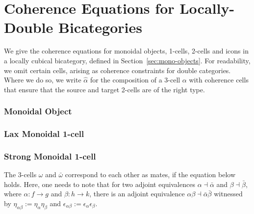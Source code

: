 \section{Coherence Equations for Locally-Double Bicategories}
\label{ap:coherence}

We give the coherence equations for  monoidal objects, 1-cells, 2-cells and icons in a locally cubical bicategory, defined in Section~\ref{sec:mono-objects}. For readability, we omit certain cells, arising as coherence constraints for double categories. Where we do so, we write $\hat{\alpha}$ for the composition of a 3-cell ${\alpha}$ with coherence cells that ensure that the source and target 2-cells are of the right type.

\subsubsection*{Monoidal Object}

 \newpage
 \newpage
 \newpage


\subsubsection*{Lax Monoidal 1-cell}

 \newpage
 \newpage

\subsubsection*{Strong Monoidal 1-cell}


%

The 3-cells $\omega$ and $\bar{\omega}$ correspond to each other as mates, if the equation below holds. Here, one needs to note that for two adjoint equivalences $\alpha \dashv \bar{\alpha}$ and $\beta \dashv \bar{\beta}$, where $\alpha: f \rightarrow g$ and $\beta: h \rightarrow k$, there is an adjoint equivalence $\alpha \beta \dashv \bar{\alpha}\bar{\beta}$ witnessed by $\eta_{\alpha \beta} := \eta_{\alpha} \eta_{\beta}$ and $\epsilon_{\alpha \beta} :=  \epsilon_{\alpha} \epsilon_{\beta}$.  



